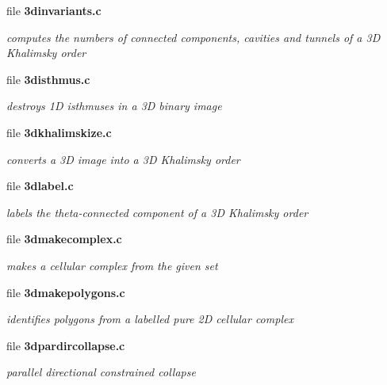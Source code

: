 \begin{CompactItemize}
\item 
file \bf{3dinvariants.c}
\begin{CompactList}\small\item\em computes the numbers of connected components, cavities and tunnels of a 3D Khalimsky order \item\end{CompactList}

\item 
file \bf{3disthmus.c}
\begin{CompactList}\small\item\em destroys 1D isthmuses in a 3D binary image \item\end{CompactList}

\item 
file \bf{3dkhalimskize.c}
\begin{CompactList}\small\item\em converts a 3D image into a 3D Khalimsky order \item\end{CompactList}

\item 
file \bf{3dlabel.c}
\begin{CompactList}\small\item\em labels the theta-connected component of a 3D Khalimsky order \item\end{CompactList}

\item 
file \bf{3dmakecomplex.c}
\begin{CompactList}\small\item\em makes a cellular complex from the given set \item\end{CompactList}

\item 
file \bf{3dmakepolygons.c}
\begin{CompactList}\small\item\em identifies polygons from a labelled pure 2D cellular complex \item\end{CompactList}

\item 
file \bf{3dpardircollapse.c}
\begin{CompactList}\small\item\em parallel directional constrained collapse \item\end{CompactList}


\end{CompactItemize}
